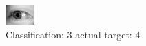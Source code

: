 \begin{figure}[h!]
\begin{center}
\includegraphics[width=0.60\columnwidth]{figures/ID3142_class_3_target_4.png}
\end{center}
\caption{ Classification: 3 actual target: 4}
\label{fig:ID3142_class_3_target_4}
\end{figure}

